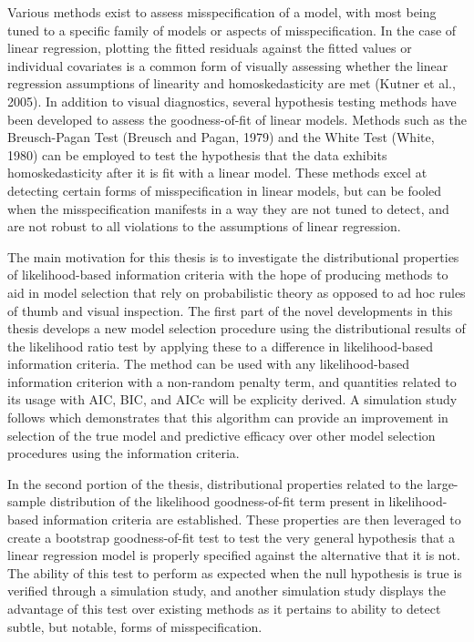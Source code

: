 		Various methods exist to assess misspecification of a model, with most being tuned to a specific family of models or aspects of misspecification. In the case of linear regression,
		plotting the fitted residuals against the fitted values or individual covariates is a common form of visually assessing whether the linear regression assumptions of linearity and
		homoskedasticity are met (Kutner et al., 2005). In addition to visual diagnostics, several hypothesis testing methods have been developed to assess the goodness-of-fit of linear
		models. Methods such as the Breusch-Pagan Test (Breusch and Pagan, 1979) and the White Test (White, 1980) can be employed to test the hypothesis that the data exhibits homoskedasticity
		after it is fit with a linear model. These methods excel at detecting certain forms of misspecification in linear models, but can be fooled when the misspecification manifests in a
		way they are not tuned to detect, and are not robust to all violations to the assumptions of linear regression.

		The main motivation for this thesis is to investigate the distributional properties of likelihood-based information criteria with the hope of producing methods to aid in model selection
		that rely on probabilistic theory as opposed to ad hoc rules of thumb and visual inspection. The first part of the novel developments in this thesis develops a new model selection procedure using the distributional
		results of the likelihood ratio test by applying these to a difference in likelihood-based information criteria. The method can be used with any likelihood-based information criterion
		with a non-random penalty term, and quantities related to its usage with AIC, BIC, and AICc will be explicity derived. A simulation study follows which demonstrates that this algorithm
		can provide an improvement in selection of the true model and predictive efficacy over other model selection procedures using the information criteria.
		
		In the second portion of the thesis, distributional properties related to the large-sample distribution of the likelihood goodness-of-fit term present in likelihood-based information criteria
		are established. These properties are then leveraged to create a bootstrap goodness-of-fit test to test the very general hypothesis that a linear regression model is properly specified
		against the alternative that it is not. The ability of this test to perform as expected when the null hypothesis is true is verified through a simulation study, and another simulation
		study displays the advantage of this test over existing methods as it pertains to ability to detect subtle, but notable, forms of misspecification.

